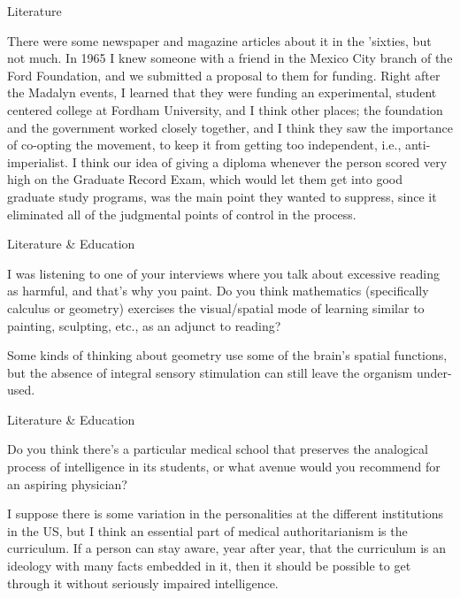 \documentclass[11pt,oneside,openany,extrafontsizes]{memoir}
\begin{document}
\begin{emailexchange}{Literature}
    \begin{answer}
      There were some newspaper and magazine articles about it in the 'sixties, but not much. In 1965 I knew someone with a friend in the Mexico City branch of the Ford Foundation, and we submitted a proposal to them for funding. Right after the Madalyn events, I learned that they were funding an experimental, student centered college at Fordham University, and I think other places; the foundation and the government worked closely together, and I think they saw the importance of co-opting the movement, to keep it from getting too independent, i.e., anti-imperialist. I think our idea of giving a diploma whenever the person scored very high on the Graduate Record Exam, which would let them get into good graduate study programs, was the main point they wanted to suppress, since it eliminated all of the judgmental points of control in the process.
    \end{answer}
\end{emailexchange}

\begin{qaexchange}{Literature \& Education}

    \begin{question}
        I was listening to one of your interviews where you talk about excessive reading as harmful, and that's why you paint. Do you think mathematics (specifically calculus or geometry) exercises the visual/spatial mode of learning similar to painting, sculpting, etc., as an adjunct to reading?
    \end{question}

    \begin{answer}
      Some kinds of thinking about geometry use some of the brain's spatial functions, but the absence of integral sensory stimulation can still leave the organism under-used.
    \end{answer}
\end{qaexchange}

\begin{qaexchange}{Literature \& Education}

    \begin{question}
        Do you think there's a particular medical school that preserves the analogical process of intelligence in its students, or what avenue would you recommend for an aspiring physician?
    \end{question}

    \begin{answer}
       I suppose there is some variation in the personalities at the different institutions in the US, but I think an essential part of medical authoritarianism is the curriculum. If a person can stay aware, year after year, that the curriculum is an ideology with many facts embedded in it, then it should be possible to get through it without seriously impaired intelligence. 
    \end{answer}
\end{qaexchange}
\end{document}
